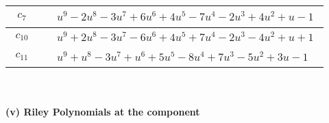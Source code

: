 \documentclass[1p]{elsarticle_modified}
\theoremstyle{definition}
\begin{document}
\begin{tabular}{m{50pt}|m{274pt}}
\hline $$\begin{aligned}c_{7}\end{aligned}$$&$\begin{aligned}
&u^9-2 u^8-3 u^7+6 u^6+4 u^5-7 u^4-2 u^3+4 u^2+u-1
\end{aligned}$\\
\hline $$\begin{aligned}c_{10}\end{aligned}$$&$\begin{aligned}
&u^9+2 u^8-3 u^7-6 u^6+4 u^5+7 u^4-2 u^3-4 u^2+u+1
\end{aligned}$\\
\hline $$\begin{aligned}c_{11}\end{aligned}$$&$\begin{aligned}
&u^9+u^8-3 u^7+u^6+5 u^5-8 u^4+7 u^3-5 u^2+3 u-1
\end{aligned}$\\
\hline
\end{tabular}\\~\\
\newpage\renewcommand{\arraystretch}{1}
\flushleft \textbf{(v) Riley Polynomials at the component}\newline \\
\end{document}

